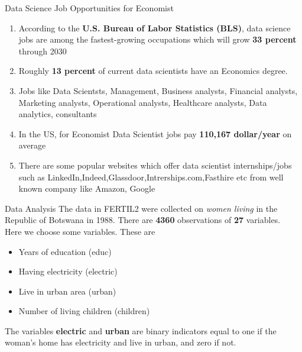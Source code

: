 \documentclass{beamer}
\begin{document}
	
	\begin{frame}[t]{Data Science Job Opportunities for Economist}
		
		
		\begin{enumerate}
			\item According to the \textbf{U.S. Bureau of Labor Statistics (BLS)}, data science jobs are among the fastest-growing occupations which will grow \textbf {33 percent} through 2030
			\item  Roughly \textbf{ 13 percent} of current data scientists have an Economics degree.
			\item  Jobs like
			Data Scientsts,
			Management,
			 Business analysts,
			 Financial analysts,
			 Marketing analysts,
			 Operational analysts,
			 Healthcare analysts, Data analytics, consultants 
			\item In the US, for Economist Data Scientist jobs pay \textbf {110,167 dollar/year} on average
			\item There are some popular websites which offer data scientist internships/jobs such 
			as LinkedIn,Indeed,Glassdoor,Intrerships.com,Fasthire etc from well known company like Amazon, Google
			
		\end{enumerate}
	\end{frame}
\begin{frame}[t]{Data Analysis}
The data in FERTIL2 were collected on \emph{women living} in the Republic of Botswana in 1988. 
There are \textbf{ 4360} observations of \textbf{ 27 }variables.\\
Here we choose some variables. These are
\begin{itemize}
	\item Years of education (educ)
	\item Having electricity (electric)
	\item Live in urban area (urban)
	\item Number of living children (children)
\end{itemize}
The variables \textbf{ electric} and \textbf{ urban} are binary indicators equal to one if 
the woman’s home has electricity and live in urban, and zero if not.
\end{frame}
\end{document}
